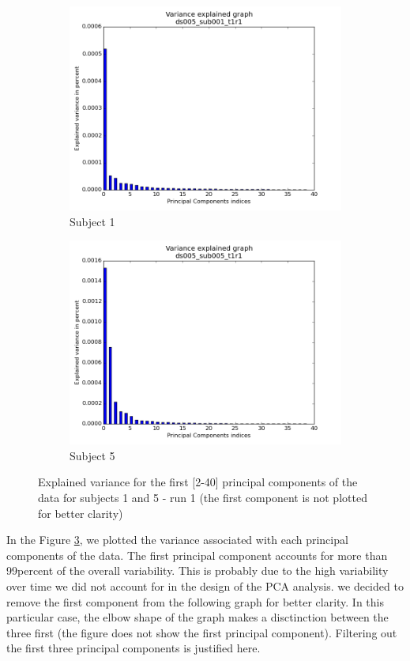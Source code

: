 \begin{figure}[H]
\begin{subfigure}{.5\textwidth}
    \centering
    \includegraphics[width=.9\linewidth]{../fig/pca/ds005_sub001_t1r1_variance_explained.png}
    \caption{Subject 1}
    \label{fig:var1}
\end{subfigure}%
\begin{subfigure}{.5\textwidth}
    \centering
    \includegraphics[width=.9\linewidth]{../fig/pca/ds005_sub005_t1r1_variance_explained.png}
    \caption{Subject 5}
    \label{fig:var2}
\end{subfigure}
\caption{Explained variance for the first [2-40] principal components of the data for subjects 1 and 5 - run 1 (the first component is not plotted for better clarity) }
\label{fig:vara}
\end{figure}

\noindent
\par In the Figure \ref{fig:vara}, we plotted the variance associated with each principal
components of the data. The first principal component accounts for more than 99percent of 
the overall variability. This is probably due to the high variability over time we did not
account for in the design of the PCA analysis. 
we decided to remove the first component from the following graph for better clarity.
In this particular case, the elbow shape of the graph makes a disctinction between the three first 
(the figure does not show the first principal component). Filtering out the first three principal 
components is justified here.

